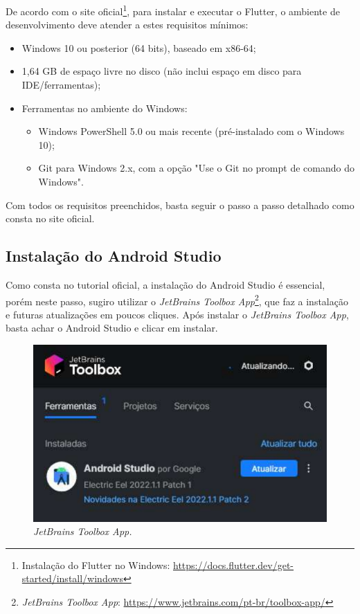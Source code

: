 De acordo com o site oficial\footnote{\label{flutter_install}Instalação do Flutter no Windows: \url{https://docs.flutter.dev/get-started/install/windows}}, para instalar e executar o Flutter, o ambiente de desenvolvimento deve atender a estes requisitos mínimos:
\begin{itemize}
   \item Windows 10 ou posterior (64 bits), baseado em x86-64;
   \item 1,64 GB de espaço livre no disco (não inclui espaço em disco para IDE/ferramentas);
   \item Ferramentas no ambiente do Windows:
   \begin{itemize}
     \item Windows PowerShell 5.0 ou mais recente (pré-instalado com o Windows 10);
     \item Git para Windows 2.x, com a opção "Use o Git no prompt de comando do Windows".
   \end{itemize}
 \end{itemize}

 Com todos os requisitos preenchidos, basta seguir o passo a passo detalhado como consta no site oficial.

\subsection{Instalação do Android Studio}\label{ssec:instalacao_android_studio}
Como consta no tutorial oficial, a instalação do Android Studio é essencial, porém neste passo, sugiro utilizar o \textit{JetBrains Toolbox App}\footnote{\label{toolbox}\textit{JetBrains Toolbox App}: \url{https://www.jetbrains.com/pt-br/toolbox-app/}}, que faz a instalação e futuras atualizações em poucos cliques. Após instalar o \textit{JetBrains Toolbox App}, basta achar o Android Studio e clicar em instalar.

\begin{figure}[H]
\centering
  \includegraphics{images/toolbox.pdf}
  \caption{\textit{JetBrains Toolbox App.}}
  \label{fig:toolbox}
\end{figure}

